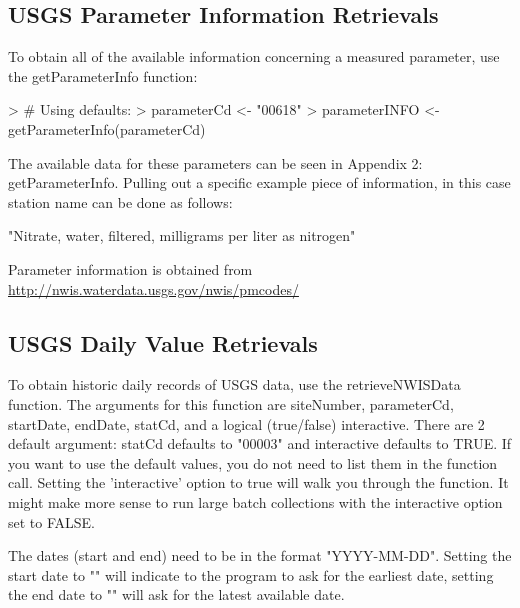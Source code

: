 \documentclass[a4paper,11pt]{article}
\begin{document}
\subsection{USGS Parameter Information Retrievals}
To obtain all of the available information concerning a measured parameter, use the getParameterInfo function:
\begin{Schunk}
\begin{Sinput}
> # Using defaults:
> parameterCd <- "00618" 
> parameterINFO <- getParameterInfo(parameterCd)
\end{Sinput}
\end{Schunk}

The available data for these parameters can be seen in Appendix 2: getParameterInfo. Pulling out a specific example piece of information, in this case station name can be done as follows:
\begin{Schunk}
\begin{Soutput}
[1] "Nitrate, water, filtered, milligrams per liter as nitrogen"
\end{Soutput}
\end{Schunk}
Parameter information is obtained from \url{http://nwis.waterdata.usgs.gov/nwis/pmcodes/}



\subsection{USGS Daily Value Retrievals}
To obtain historic daily records of USGS data, use the retrieveNWISData function. The arguments for this function are siteNumber, parameterCd, startDate, endDate, statCd, and a logical (true/false) interactive. There are 2 default argument: statCd defaults to "00003" and interactive defaults to TRUE.  If you want to use the default values, you do not need to list them in the function call. Setting the 'interactive' option to true will walk you through the function. It might make more sense to run large batch collections with the interactive option set to FALSE. 

The dates (start and end) need to be in the format "YYYY-MM-DD".  Setting the start date to "" will indicate to the program to ask for the earliest date, setting the end date to "" will ask for the latest available date.
\end{document}
